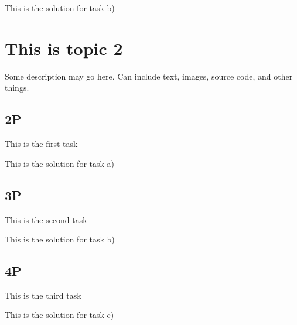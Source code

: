 \documentclass[a4paper,12pt]{article}
\begin{document}
\begin{solution}
    This is the solution for task b)
\end{solution}


\section{This is topic 2}
Some description may go here. Can include text, images, source code, and other things. 

\subsection{2P}
This is the first task

\begin{solution}
    This is the solution for task a)
\end{solution}


\subsection{3P}
This is the second task

\begin{solution}
    This is the solution for task b)
\end{solution}


\subsection{4P}
This is the third task

\begin{solution}
    This is the solution for task c)
\end{solution}
\end{document}
